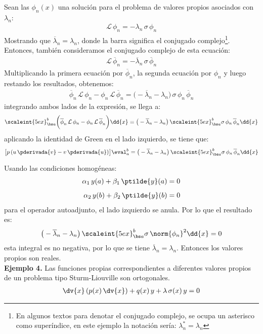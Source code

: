 Sean las $\phi_{n}(x)$ una solución para el problema de valores propios asociados con $\lambda_{n}$:
\begin{align*}
\mathcal{L} \, \phi_{n} = - \lambda_{n} \, \sigma \, \phi_{n}
\end{align*}
Mostrando que $\overline{\lambda}_{n} = \lambda_{n}$, donde la barra significa el conjugado complejo\footnote{En algunos textos para denotar el conjugado complejo, se ocupa un asterisco como superíndice, en este ejemplo la notación sería: $\lambda_{n}^{*} = \lambda_{n}$}. Entonces, también consideramos el conjugado complejo de esta ecuación:
\begin{align*}
\mathcal{L} \, \overline{\phi}_{n} = - \overline{\lambda}_{n} \, \sigma \, \overline{\phi}_{n}
\end{align*}
Multiplicando la primera ecuación por $\overline{\phi}_{n}$, la segunda ecuación por $\phi_{n}$ y luego restando los resultados, obtenemos:
\begin{align*}
\overline{\phi}_{n} \, \mathcal{L} \, \phi_{n} - \phi_{n} \, \mathcal{L} \, \overline{\phi}_{n} = \big( - \overline{\lambda}_{n} - \lambda_{n} \big) \, \sigma \, \phi_{n} \, \overline{\phi}_{n}
\end{align*}
integrando ambos lados de la expresión, se llega a:
\begin{align*}
\scaleint{5ex}_{\bs a}^{b} \bigg( \overline{\phi}_{n} \, \mathcal{L} \, \phi_{n} - \phi_{n} \, \mathcal{L} \, \overline{\phi}_{n} \bigg) \dd{x} = \big( - \overline{\lambda}_{n} - \lambda_{n} \big) \, \scaleint{5ex}_{\bs a}^{b} \sigma \, \phi_{n} \, \overline{\phi}_{n} \dd{x}
\end{align*}
aplicando la identidad de Green en el lado izquierdo, se tiene que:
\begin{align*}
\big[ p \, (u \, \pderivada{v} - v \, \pderivada{u}) \big]\eval_{a}^{b} = \big( - \overline{\lambda}_{n} - \lambda_{n} \big) \, \scaleint{5ex}_{\bs a}^{b} \sigma \, \phi_{n} \, \overline{\phi}_{n} \dd{x}
\end{align*}

Usando las condiciones homogéneas:
\begin{align*}
\alpha_{1} \, y(a) + \beta_{1} \, \ptilde{y} (a) &= 0 \\[0.5em]
\alpha_{2} \, y(b) + \beta_{2} \, \ptilde{y} (b) &= 0
\end{align*}
para el operador autoadjunto, el lado izquierdo se anula. Por lo que el resultado es:
\begin{align*}
\big( - \overline{\lambda}_{n} - \lambda_{n} \big) \, \scaleint{5ex}_{\bs a}^{b} \sigma \, \norm{\phi_{n}}^{2} \dd{x} = 0
\end{align*}
esta integral es no negativa, por lo que se tiene $\overline{\lambda}_{n} = \lambda_{n}$. Entonces los valores propios son reales.
\\
\noindent
\textbf{Ejemplo 4.} Las funciones propias correspondientes a diferentes valores propios de un problema tipo Sturm-Liouville son ortogonales.
\begin{align*}
\dv{x} \left( p(x) \, \dv{x} \right) + q(x) \, y + \lambda \, \sigma (x) \, y = 0
\end{align*}

